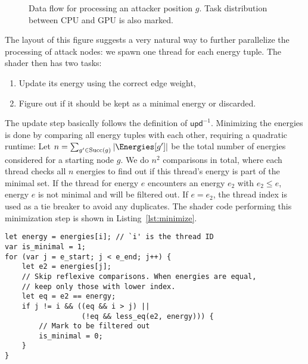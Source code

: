 \begin{figure}[ht]
\begin{center}
\end{center}
\caption{Data flow for processing an attacker position $g$.
    Task distribution between CPU and GPU is also marked.
}%
\label{fig:attack}
\end{figure}

The layout of this figure suggests a very natural way to further parallelize
the processing of attack nodes:
we spawn one thread for each energy tuple.
The shader then has two tasks:
\begin{enumerate}
    \item Update its energy using the correct edge weight,
    \item Figure out if it should be kept as a minimal energy or discarded.
\end{enumerate}

The update step basically follows the definition of $\mathsf{upd}^{-1}$.
Minimizing the energies is done by comparing all energy tuples with each other,
requiring a quadratic runtime:
Let $n = \sum_{g' \in \mathrm{Succ}(g)} | \Energies[g'] |$ be the total number
of energies considered for a starting node $g$.
We do $n^2$ comparisons in total, where each thread checks all $n$
energies to find out if this thread's energy is part of the minimal set.
If the thread for energy $e$ encounters an energy $e_2$ with $e_2 \leq e$,
energy $e$ is not minimal and will be filtered out. If $e = e_2$, the thread
index is used as a tie breaker to avoid any duplicates.
The shader code performing this minimization step is shown in
Listing~\ref{lst:minimize}.

\begin{lstlisting}[language=WGSL,float,
    caption={WGSL Shader Code for minimizing energies.
        \texttt{i} is the thread ID
        and determines the energy that this thread processes.
        It is compared against energies at index \texttt{j},
        which loops through the range of energies to minimize,
        denoted by \texttt{e\_start} and \texttt{e\_end}.
        The function \texttt{less\_eq} is shown in Listing~\ref{lst:less_eq}.},
    label=lst:minimize]
let energy = energies[i]; // `i' is the thread ID
var is_minimal = 1;
for (var j = e_start; j < e_end; j++) {
    let e2 = energies[j];
    // Skip reflexive comparisons. When energies are equal,
    // keep only those with lower index.
    let eq = e2 == energy;
    if j != i && ((eq && i > j) ||
                  (!eq && less_eq(e2, energy))) {
        // Mark to be filtered out
        is_minimal = 0;
    }
}
\end{lstlisting}

